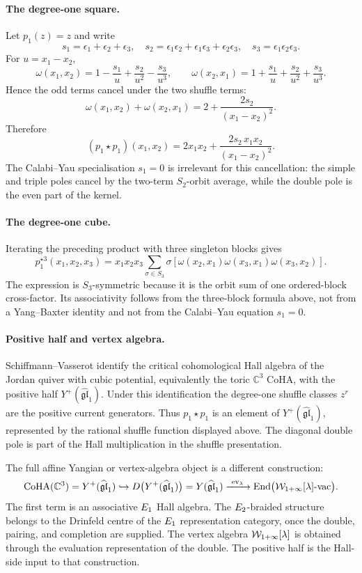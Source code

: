 \paragraph{The degree-one square.}
Let $p_1(z)=z$ and write
\[
s_1=\epsilon_1+\epsilon_2+\epsilon_3,\quad
s_2=\epsilon_1\epsilon_2+\epsilon_1\epsilon_3+\epsilon_2\epsilon_3,\quad
s_3=\epsilon_1\epsilon_2\epsilon_3.
\]
For $u=x_1-x_2$,
\[
\omega(x_1,x_2)=1-\frac{s_1}{u}+\frac{s_2}{u^2}-\frac{s_3}{u^3},
\qquad
\omega(x_2,x_1)=1+\frac{s_1}{u}+\frac{s_2}{u^2}+\frac{s_3}{u^3}.
\]
Hence the odd terms cancel under the two shuffle terms:
\[
\omega(x_1,x_2)+\omega(x_2,x_1)
=2+\frac{2s_2}{(x_1-x_2)^2}.
\]
Therefore
\[
\boxed{\;
(p_1\star p_1)(x_1,x_2)
=
2x_1x_2+\frac{2s_2\,x_1x_2}{(x_1-x_2)^2}.
\;}
\]
The Calabi--Yau specialisation $s_1=0$ is irrelevant for this
cancellation: the simple and triple poles cancel by the two-term
$S_2$-orbit average, while the double pole is the even part of the
kernel.

\paragraph{The degree-one cube.}
Iterating the preceding product with three singleton blocks gives
\[
p_1^{\star 3}(x_1,x_2,x_3)
=
x_1x_2x_3
\sum_{\sigma\in S_3}
\sigma\!\left[
\omega(x_2,x_1)\omega(x_3,x_1)\omega(x_3,x_2)
\right].
\]
The expression is $S_3$-symmetric because it is the orbit sum of one
ordered-block cross-factor. Its associativity follows from the
three-block formula above, not from a Yang--Baxter identity and not from
the Calabi--Yau equation $s_1=0$.

\paragraph{Positive half and vertex algebra.}
Schiffmann--Vasserot identify the critical cohomological Hall algebra of
the Jordan quiver with cubic potential, equivalently the toric
$\mathbb{C}^3$ CoHA, with the positive half
$Y^+(\widehat{\mathfrak{gl}}_1)$. Under this identification the
degree-one shuffle classes $z^r$ are the positive current generators.
Thus $p_1\star p_1$ is an element of $Y^+(\widehat{\mathfrak{gl}}_1)$,
represented by the rational shuffle function displayed above. The
diagonal double pole is part of the Hall multiplication in the shuffle
presentation.

The full affine Yangian or vertex-algebra object is a different
construction:
\[
\mathrm{CoHA}(\mathbb{C}^3)
=Y^+(\widehat{\mathfrak{gl}}_1)
\hookrightarrow
D\bigl(Y^+(\widehat{\mathfrak{gl}}_1)\bigr)
=Y(\widehat{\mathfrak{gl}}_1)
\xrightarrow{\ \mathrm{ev}_\lambda\ }
\operatorname{End}\bigl(\mathcal{W}_{1+\infty}[\lambda]\text{-}\mathrm{vac}\bigr).
\]
The first term is an associative $E_1$ Hall algebra. The
$E_2$-braided structure belongs to the Drinfeld centre of the
$E_1$ representation category, once the double, pairing, and
completion are supplied. The vertex algebra $\mathcal{W}_{1+\infty}[\lambda]$ is obtained
through the evaluation representation of the double. The positive half
is the Hall-side input to that construction.

